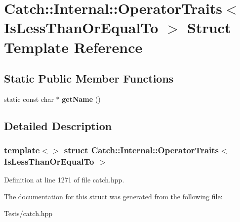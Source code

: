 \hypertarget{struct_catch_1_1_internal_1_1_operator_traits_3_01_is_less_than_or_equal_to_01_4}{}\section{Catch\+:\+:Internal\+:\+:Operator\+Traits$<$ Is\+Less\+Than\+Or\+Equal\+To $>$ Struct Template Reference}
\label{struct_catch_1_1_internal_1_1_operator_traits_3_01_is_less_than_or_equal_to_01_4}
\subsection*{Static Public Member Functions}
\begin{DoxyCompactItemize}
\item 
\mbox{\label{struct_catch_1_1_internal_1_1_operator_traits_3_01_is_less_than_or_equal_to_01_4_ae8578813bc847838f10448c1541a9d7b}} 
static const char $\ast$ {\bfseries get\+Name} ()
\end{DoxyCompactItemize}


\subsection{Detailed Description}
\subsubsection*{template$<$$>$\newline
struct Catch\+::\+Internal\+::\+Operator\+Traits$<$ Is\+Less\+Than\+Or\+Equal\+To $>$}



Definition at line 1271 of file catch.\+hpp.



The documentation for this struct was generated from the following file\+:\begin{DoxyCompactItemize}
\item 
Tests/catch.\+hpp\end{DoxyCompactItemize}
